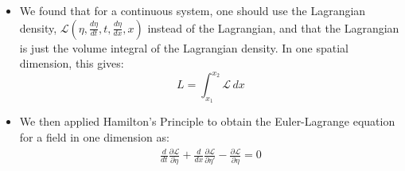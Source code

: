 \documentclass[10pt]{report}
\newcommand{\die}[2]{\frac{\partial #1}{\partial #2}}
\newcommand{\lagd}{\mathcal{L}}
\begin{document}
\begin{itemize}
\item We found that for a continuous system, one should use the Lagrangian density, $\mathcal{L}(\eta,\frac{d\eta}{dt},t,\frac{d\eta}{dx},x)$ instead of the Lagrangian, and that the Lagrangian is just the volume integral of the Lagrangian density. In one spatial dimension, this gives:
\begin{equation}
L= \int_{x_1}^{x_2}\mathcal{L}\,dx
\end{equation}
\item We then applied Hamilton's Principle to obtain the Euler-Lagrange equation for a field in one dimension as:
\begin{align*}
\frac{d}{dt}\die{\lagd}{\dot\eta}+\frac{d}{dx}\die{\lagd}{\eta'}-\die{\lagd}{\eta}=0
\end{align*}
\end{itemize}
\end{document}
